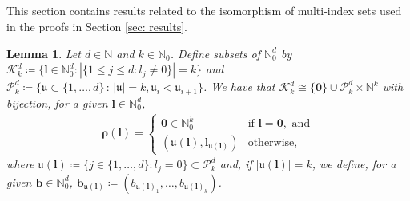 \documentclass[pdflatex,sn-mathphys-num]{sn-jnl}%
\theoremstyle{thmstyleone}%
\newtheorem{lemma}{Lemma}%
\theoremstyle{thmstyletwo}%
\theoremstyle{thmstylethree}%
\begin{document}
\begin{appendices}

\section{}\label{appendix: a}

This section contains results related to the isomorphism of multi-index sets used in the proofs in Section \ref{sec: results}.

\begin{lemma}\label{lem: bijection}
    Let \(d\in\mathbb{N}\) and \(k\in\mathbb{N}_0\). Define subsets of \(\mathbb{N}_0^d\) by \(\mathcal{K}^d_k\coloneqq\{\boldsymbol{l}\in\mathbb{N}_{0}^d:|\{1\leq j\leq d:l_j\neq0\}|=k\}\) and \(\mathcal{P}^d_k\coloneqq\{\mathfrak{u}\subset\{1,\dots,d\}\,:\,|\mathfrak{u}|=k, \mathfrak{u}_i<\mathfrak{u}_{i+1}\}\). We have that \(\mathcal{K}_k^d\cong\{\mathbf{0}\}\cup\mathcal{P}^d_k\times\mathbb{N}^k\) with bijection, for a given \(\boldsymbol{l}\in\mathbb{N}_0^d\),
    \begin{align}
        \boldsymbol{\rho}(\boldsymbol{l}) = \begin{cases}
            \mathbf{0}\in\mathbb{N}_0^k&\textrm{if }\boldsymbol{l}=\mathbf{0}, \textrm{ and}\\
            \left(\mathfrak{u}(\boldsymbol{l}),\boldsymbol{l}_{\mathfrak{u}(\boldsymbol{l})}\right)&\textrm{otherwise},
            \end{cases}\nonumber
    \end{align}
    where \(\mathfrak{u}(\boldsymbol{l})\coloneqq\{j\in\{1,\dots,d\}:l_j=0\}\subset\mathcal{P}^d_k\) and, if \(|\mathfrak{u}(\boldsymbol{l})|=k\), we define, for a given \(\mathbf{b}\in\mathbb{N}_0^d\), \(\mathbf{b}_{\mathfrak{u}(\boldsymbol{l})}\coloneqq(b_{\mathfrak{u}(\boldsymbol{l})_1},\dots,b_{\mathfrak{u}(\boldsymbol{l})_k})\).
\end{lemma}


\end{appendices}
\end{document}
